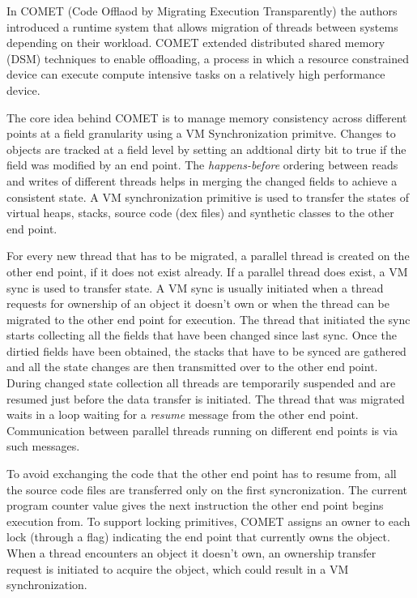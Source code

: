 In COMET (Code Offlaod by Migrating Execution Transparently) \cite{comet} 
the authors introduced a runtime system that allows migration of threads 
between systems depending on their workload. COMET extended distributed 
shared memory (DSM) techniques to enable offloading, a process in which
a resource constrained device can execute compute intensive tasks on a 
relatively high performance device. 

The core idea behind COMET is to manage memory consistency across different
points at a field 
granularity using a VM Synchronization primitve. Changes to objects are 
tracked at a field level by setting an addtional dirty bit to true if the 
field was modified by an end point. The \textit{happens-before} ordering 
between reads and writes of different threads helps in merging the changed 
fields to achieve a consistent state. A VM synchronization primitive is used 
to transfer the states of virtual heaps, stacks, source code (dex files) and 
synthetic classes to the other end point. 


For every new thread that has to be migrated, a parallel thread is 
created on the other end point, if it does not exist already. If a parallel
thread does exist, a VM sync is used to transfer state. 
A VM sync is usually initiated when a thread requests for ownership of 
an object it doesn't own or when the thread can be migrated to the other 
end point for execution. The thread that initiated the sync starts 
collecting all the fields that have been changed since last sync. Once the 
dirtied fields have been obtained, the stacks that have to be synced are 
gathered and all the state changes are then transmitted over to the other 
end point. During changed state collection all threads are temporarily suspended
and are resumed just before the data transfer is initiated. The thread that was 
migrated waits in a loop waiting for a \textit{resume} message from the other 
end point. Communication between parallel threads running on different end points
is via such messages.  	


To avoid exchanging
the code that the other end point has to resume from, all the source code files are 
transferred only on the first syncronization. The current program counter value 
gives the next instruction the other end point begins execution from. To support 
locking primitives, COMET assigns an owner to each lock (through a flag) 
indicating the end point that currently owns the object. When a thread 
encounters an object it doesn't own, an ownership transfer request is 
initiated to acquire the object, which could result in a VM synchronization. 

